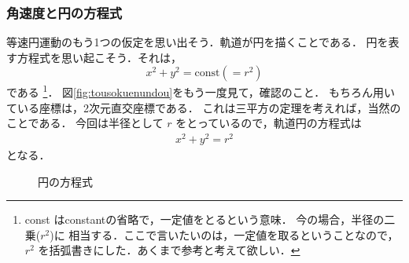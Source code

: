            \subsubsection{角速度と円の方程式}
                等速円運動のもう1つの仮定を思い出そう．軌道が円を描くことである．
                円を表す方程式を思い起こそう．それは，
                    \begin{equation*}
                        x^{2} + y^{2} = \mathrm{const} ( = r^{2} )
                    \end{equation*}
                である
                    \footnote{
                        const はconstantの省略で，一定値をとるという意味．
                        今の場合，半径の二乗($r^{2}$)に
                        相当する．ここで言いたいのは，一定値を取るということなので，
                        $r^{2}$ を括弧書きにした．あくまで参考と考えて欲しい．
                    }．
                図\ref{fig:tousokuenundou}をもう一度見て，確認のこと．
                もちろん用いている座標は，2次元直交座標である．
                これは三平方の定理を考えれば，当然のことである．
                今回は半径として $r$ をとっているので，軌道円の方程式は
                    \begin{align}\label{eq:en_no_houteisiki}
                        x^{2} + y^{2} = r^{2}
                    \end{align}
                となる．
                        \begin{figure}[hbt]
                            \begin{center}
                                \caption{円の方程式}
                                \label{fig:en_no_houteisiki}
                            \end{center}
                        \end{figure}


